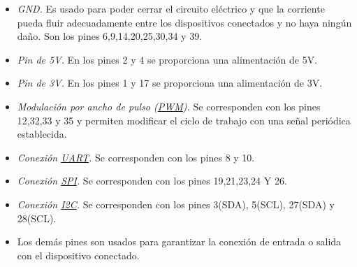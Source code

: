 \begin{itemize}
 \item \textit{GND.} Es usado para poder cerrar el circuito eléctrico y que la corriente pueda fluir adecuadamente entre los dispositivos conectados y no haya ningún daño. Son los pines 6,9,14,20,25,30,34 y 39.
 \item \textit{Pin de 5V.} En los pines 2 y 4 se proporciona una alimentación de 5V.
 \item \textit{Pin de 3V.} En los pines 1 y 17 se proporciona una alimentación de 3V.
 \item \textit{Modulación por ancho de pulso (\hyperlink{PWM}{PWM}).} Se corresponden con los pines 12,32,33 y 35 y permiten modificar el ciclo de trabajo con una señal periódica establecida.
 \item \textit{Conexión \hyperlink{UART}{UART}.} Se corresponden con los pines 8 y 10.
 \item \textit{Conexión \hyperlink{SPI}{SPI}.} Se corresponden con los pines 19,21,23,24 Y 26.
 \item \textit{Conexión \hyperlink{I2C}{I2C}.} Se corresponden con los pines 3(SDA), 5(SCL), 27(SDA) y 28(SCL).	
 \item \textit{} Los demás pines son usados para garantizar la conexión de entrada o salida con el dispositivo conectado. 
\end{itemize}\

